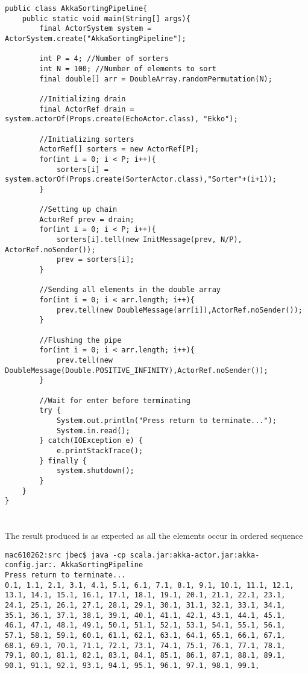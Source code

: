 \documentclass{ituhandin}
\begin{document}
\begin{lstlisting}[caption=Starting method of \texttt{AkkeSortingPipeline}, label={lst:akkaMain}]
public class AkkaSortingPipeline{
    public static void main(String[] args){
        final ActorSystem system = ActorSystem.create("AkkaSortingPipeline");

        int P = 4; //Number of sorters
        int N = 100; //Number of elements to sort
        final double[] arr = DoubleArray.randomPermutation(N); 

        //Initializing drain               
        final ActorRef drain = system.actorOf(Props.create(EchoActor.class), "Ekko");

        //Initializing sorters
        ActorRef[] sorters = new ActorRef[P]; 
        for(int i = 0; i < P; i++){
            sorters[i] = system.actorOf(Props.create(SorterActor.class),"Sorter"+(i+1));
        }

        //Setting up chain
        ActorRef prev = drain;
        for(int i = 0; i < P; i++){
            sorters[i].tell(new InitMessage(prev, N/P), ActorRef.noSender()); 
            prev = sorters[i];
        }

        //Sending all elements in the double array
        for(int i = 0; i < arr.length; i++){
            prev.tell(new DoubleMessage(arr[i]),ActorRef.noSender());
        }

        //Flushing the pipe
        for(int i = 0; i < arr.length; i++){
            prev.tell(new DoubleMessage(Double.POSITIVE_INFINITY),ActorRef.noSender());
        }

        //Wait for enter before terminating
        try {
            System.out.println("Press return to terminate...");
            System.in.read();
        } catch(IOException e) {
            e.printStackTrace();
        } finally {
            system.shutdown();
        }
    }
}
\end{lstlisting}


\section{}
The result produced is as expected as all the elements occur in ordered sequence
\begin{lstlisting}[language={},frame={}]
mac610262:src jbec$ java -cp scala.jar:akka-actor.jar:akka-config.jar:. AkkaSortingPipeline
Press return to terminate...
0.1, 1.1, 2.1, 3.1, 4.1, 5.1, 6.1, 7.1, 8.1, 9.1, 10.1, 11.1, 12.1, 13.1, 14.1, 15.1, 16.1, 17.1, 18.1, 19.1, 20.1, 21.1, 22.1, 23.1, 24.1, 25.1, 26.1, 27.1, 28.1, 29.1, 30.1, 31.1, 32.1, 33.1, 34.1, 35.1, 36.1, 37.1, 38.1, 39.1, 40.1, 41.1, 42.1, 43.1, 44.1, 45.1, 46.1, 47.1, 48.1, 49.1, 50.1, 51.1, 52.1, 53.1, 54.1, 55.1, 56.1, 57.1, 58.1, 59.1, 60.1, 61.1, 62.1, 63.1, 64.1, 65.1, 66.1, 67.1, 68.1, 69.1, 70.1, 71.1, 72.1, 73.1, 74.1, 75.1, 76.1, 77.1, 78.1, 79.1, 80.1, 81.1, 82.1, 83.1, 84.1, 85.1, 86.1, 87.1, 88.1, 89.1, 90.1, 91.1, 92.1, 93.1, 94.1, 95.1, 96.1, 97.1, 98.1, 99.1,
\end{lstlisting}
\end{document}
